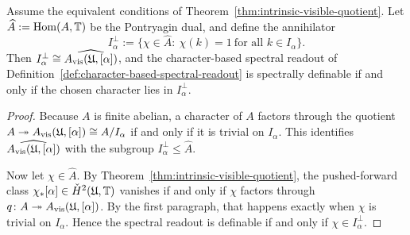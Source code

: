 \begin{proposition}
\label{thm:prefix-site-spectral-definability-avis}
Assume the equivalent conditions of
Theorem~\ref{thm:intrinsic-visible-quotient}.  Let
$\widehat A:=\operatorname{Hom}(A,\mathbb{T})$ be the Pontryagin dual, and define the
annihilator
\[
I_\alpha^\perp
:=
\{\chi\in \widehat A:\ \chi(k)=1\ \text{for all }k\in I_\alpha\}.
\]
Then $I_\alpha^\perp\cong \widehat{A_{\mathrm{vis}}(\mathfrak{U},[\alpha])}$, and the character-based spectral
readout of Definition~\ref{def:character-based-spectral-readout} is spectrally
definable if and only if the chosen character lies in $I_\alpha^\perp$.
\end{proposition}

\begin{proof}
Because $A$ is finite abelian, a character of $A$ factors through the quotient
$A\twoheadrightarrow A_{\mathrm{vis}}(\mathfrak{U},[\alpha])\cong A/I_\alpha$ if and only if it is trivial on
$I_\alpha$.
This identifies $\widehat{A_{\mathrm{vis}}(\mathfrak{U},[\alpha])}$ with the subgroup
$I_\alpha^\perp\le \widehat A$.

Now let $\chi\in\widehat A$.  By
Theorem~\ref{thm:intrinsic-visible-quotient}, the pushed-forward class
$\chi_*[\alpha]\in\check{H}^2(\mathfrak{U},\mathbb{T})$ vanishes if and only if $\chi$
factors through $q\colon A\twoheadrightarrow A_{\mathrm{vis}}(\mathfrak{U},[\alpha])$.  By the first paragraph,
that happens exactly when $\chi$ is trivial on $I_\alpha$.  Hence the spectral
readout is definable if and only if $\chi\in I_\alpha^\perp$.
\end{proof}

